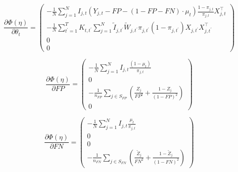 \documentclass[11pt]{amsart}
\numberwithin{equation}{section}
\theoremstyle{plain}
\begin{document}
$$
\frac{\partial \Phi (\eta)}{\partial \theta_t} =
\left (
\begin{array}{c}
-\frac{1}{N} \sum_{j=1}^N I_{j,t} (Y_{j,t} - FP - (1-FP-FN) \cdot \mu_t) \frac{1-\pi_{j,t}}{\pi_{j,t}} X_{j,t}^\top \\
- \frac{1}{N} \sum_{t^\prime = 1}^T K_{t,t^\prime} \sum_{j = 1}^N \tilde I_{j,t^\prime} \tilde W_{j,t^\prime}  \pi_{j,t^\prime} (1-\pi_{j,t^\prime}) X_{j,t^\prime} X_{j,t^\prime}^\top\\
0 \\
0
\end{array}
\right )
$$

$$
\frac{\partial \Phi (\eta)}{\partial FP} =
\left (
\begin{array}{c}
-\frac{1}{N} \sum_{j=1}^N I_{j,t} \frac{(1-\mu_t)}{\pi_{j,t}} \\
0\\
-\frac{1}{n_{FP}} \sum_{j \in S_{FP}} \left( \frac{Z_j}{FP^2} + \frac{1-Z_j}{(1-FP)^2} \right)  \\
0
\end{array}
\right )
$$

$$
\frac{\partial \Phi (\eta)}{\partial FN} =
\left (
\begin{array}{c}
- \frac{1}{N} \sum_{j=1}^N I_{j,t} \frac{\mu_t}{\pi_{j,t}} \\
0\\
0 \\
-\frac{1}{n_{FN}}  \sum_{j \in S_{FN}} \left( \frac{\tilde Z_j}{FN^2} + \frac{1-\tilde Z_j}{(1-FN)^2} \right)
\end{array}
\right )
$$
\end{document}
